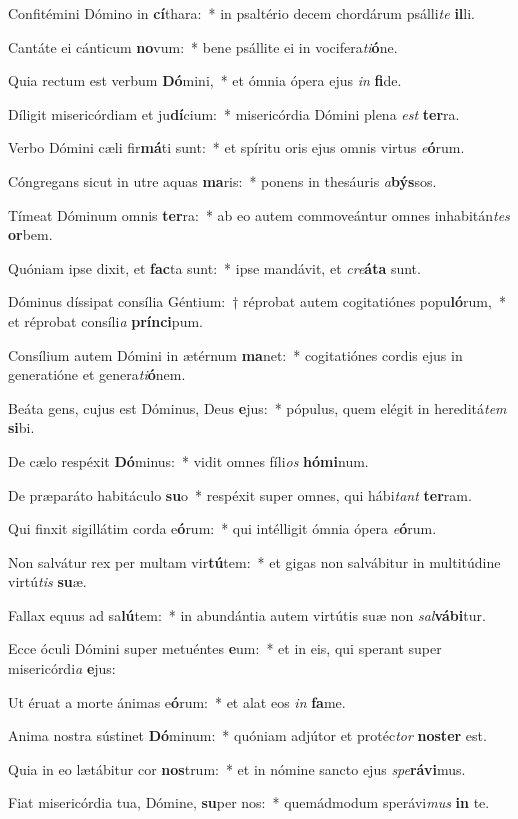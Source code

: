 \item Confitémini Dómino in \textbf{cí}thara:~* in psaltério decem chordárum psálli\textit{te} \textbf{il}li.
\item Cantáte ei cánticum \textbf{no}vum:~* bene psállite ei in vocifera\textit{ti}\textbf{ó}ne.
\item Quia rectum est verbum \textbf{Dó}mini,~* et ómnia ópera ejus \textit{in} \textbf{fi}de.
\item Díligit misericórdiam et ju\textbf{dí}cium:~* misericórdia Dómini plena \textit{est} \textbf{ter}ra.
\item Verbo Dómini cæli fir\textbf{má}ti sunt:~* et spíritu oris ejus omnis virtus \textit{e}\textbf{ó}rum.
\item Cóngregans sicut in utre aquas \textbf{ma}ris:~* ponens in thesáuris \textit{a}\textbf{býs}sos.
\item Tímeat Dóminum omnis \textbf{ter}ra:~* ab eo autem commoveántur omnes inhabitán\textit{tes} \textbf{or}bem.
\item Quóniam ipse dixit, et \textbf{fac}ta sunt:~* ipse mandávit, et \textit{cre}\textbf{á}\textbf{ta} sunt.
\item Dóminus díssipat consília Géntium:~† réprobat autem cogitatiónes popu\textbf{ló}rum,~* et réprobat consíli\textit{a} \textbf{prín}\textbf{ci}pum.
\item Consílium autem Dómini in ætérnum \textbf{ma}net:~* cogitatiónes cordis ejus in generatióne et genera\textit{ti}\textbf{ó}nem.
\item Beáta gens, cujus est Dóminus, Deus \textbf{e}jus:~* pópulus, quem elégit in hereditá\textit{tem} \textbf{si}bi.
\item De cælo respéxit \textbf{Dó}minus:~* vidit omnes fíli\textit{os} \textbf{hó}\textbf{mi}num.
\item De præparáto habitáculo \textbf{su}o~* respéxit super omnes, qui hábi\textit{tant} \textbf{ter}ram.
\item Qui finxit sigillátim corda e\textbf{ó}rum:~* qui intélligit ómnia ópera \textit{e}\textbf{ó}rum.
\item Non salvátur rex per multam vir\textbf{tú}tem:~* et gigas non salvábitur in multitúdine virtú\textit{tis} \textbf{su}æ.
\item Fallax equus ad sa\textbf{lú}tem:~* in abundántia autem virtútis suæ non \textit{sal}\textbf{vá}\textbf{bi}tur.
\item Ecce óculi Dómini super metuéntes \textbf{e}um:~* et in eis, qui sperant super misericórdi\textit{a} \textbf{e}jus:
\item Ut éruat a morte ánimas e\textbf{ó}rum:~* et alat eos \textit{in} \textbf{fa}me.
\item Anima nostra sústinet \textbf{Dó}minum:~* quóniam adjútor et protéc\textit{tor} \textbf{nos}\textbf{ter} est.
\item Quia in eo lætábitur cor \textbf{nos}trum:~* et in nómine sancto ejus \textit{spe}\textbf{rá}\textbf{vi}mus.
\item Fiat misericórdia tua, Dómine, \textbf{su}per nos:~* quemádmodum sperávi\textit{mus} \textbf{in} te.
